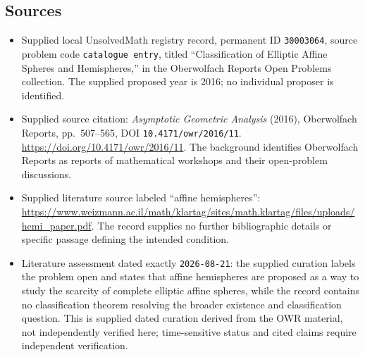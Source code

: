 \documentclass[11pt]{article}
\begin{document}
\subsection{Sources}
\begin{itemize}
\item Supplied local UnsolvedMath registry record, permanent ID \texttt{30003064}, source problem code \texttt{catalogue entry}, titled ``Classification of Elliptic Affine Spheres and Hemispheres,'' in the Oberwolfach Reports Open Problems collection. The supplied proposed year is 2016; no individual proposer is identified.
\item Supplied source citation: \emph{Asymptotic Geometric Analysis} (2016), Oberwolfach Reports, pp.~507--565, DOI \texttt{10.4171/owr/2016/11}. \url{https://doi.org/10.4171/owr/2016/11}. The background identifies Oberwolfach Reports as reports of mathematical workshops and their open-problem discussions.
\item Supplied literature source labeled ``affine hemispheres'': \url{https://www.weizmann.ac.il/math/klartag/sites/math.klartag/files/uploads/hemi_paper.pdf}. The record supplies no further bibliographic details or specific passage defining the intended condition.
\item Literature assessment dated exactly \texttt{2026-08-21}: the supplied curation labels the problem open and states that affine hemispheres are proposed as a way to study the scarcity of complete elliptic affine spheres, while the record contains no classification theorem resolving the broader existence and classification question. This is supplied dated curation derived from the OWR material, not independently verified here; time-sensitive status and cited claims require independent verification.
\end{itemize}
\end{document}
